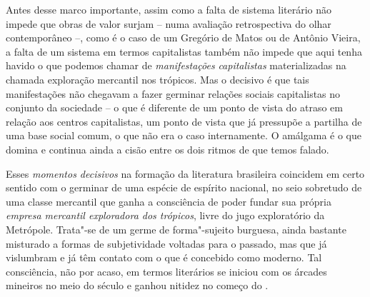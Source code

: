 Antes desse marco importante, assim como a falta de sistema literário
não impede que obras de valor surjam -- numa avaliação retrospectiva do
olhar contemporâneo --, como é o caso de um Gregório de Matos ou de
Antônio Vieira, a falta de um sistema em termos capitalistas também não
impede que aqui tenha havido o que podemos chamar de
\emph{manifestações} \emph{capitalistas} materializadas na chamada
exploração mercantil nos trópicos. Mas o decisivo é que tais
manifestações não chegavam a fazer germinar relações sociais
capitalistas no conjunto da sociedade -- o que é diferente de um ponto
de vista do atraso em relação aos centros capitalistas, um ponto de
vista que já pressupõe a partilha de uma base social comum, o que não
era o caso internamente. O amálgama é o que domina e continua ainda a
cisão entre os dois ritmos de que temos falado.

Esses \emph{momentos decisivos} na formação da literatura brasileira
coincidem em certo sentido com o germinar de uma espécie de espírito
nacional, no seio sobretudo de uma classe mercantil que ganha a
consciência de poder fundar sua própria \emph{empresa mercantil
exploradora dos trópicos}, livre do jugo exploratório da Metrópole.
Trata"-se de um germe de forma"-sujeito burguesa, ainda bastante misturado
a formas de subjetividade voltadas para o passado, mas que já vislumbram
e já têm contato com o que é concebido como moderno. Tal consciência,
não por acaso, em termos literários se iniciou com os árcades mineiros
no meio do século  e ganhou nitidez no começo do .

